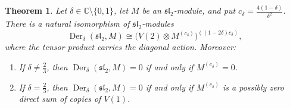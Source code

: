 \documentclass[11pt,reqno]{amsart}
\numberwithin{equation}{section}
\newcommand{\C}{\mathbb C}
\newcommand{\s}{\mathfrak{sl}_2}
\DeclareMathOperator{\Der}{Der}
\newtheorem{theorem}{Theorem}[section]
\theoremstyle{definition}
\theoremstyle{remark}
\begin{document}
\begin{theorem}\label{thm:reduction}
Let \(\delta\in\C\setminus\{0,1\}\), let \(M\) be an \(\s\)-module,
and put \(c_\delta=\frac{4(1-\delta)}{\delta^2}\).
There is a natural isomorphism of \(\s\)-modules
\begin{equation}\label{eq:rank-one-space}
\Der_\delta(\s,M)
\cong\bigl(V(2)\otimes M^{(c_\delta)}\bigr)^{((1-2\delta)c_\delta)},
\end{equation}
where the tensor product carries the diagonal action.
Moreover:
\begin{enumerate}[nosep]
\item If \(\delta\ne\frac{2}{3}\), then
\(\Der_\delta(\s,M)=0\) if and only if \(M^{(c_\delta)}=0\).

\item If \(\delta=\frac{2}{3}\), then
\(\Der_\delta(\s,M)=0\) if and only if \(M^{(c_\delta)}\) is a possibly zero
direct sum of copies of \(V(1)\).
\end{enumerate}
\end{theorem}
\end{document}
